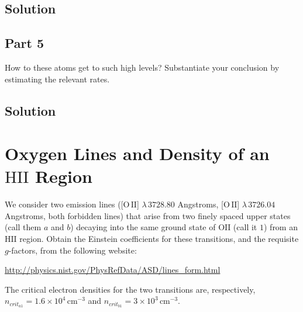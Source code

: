 \documentclass[12pt]{article}
\begin{document}
\subsection*{Solution}




\subsection*{Part 5}

How to these atoms get to such high levels? Substantiate your conclusion by estimating the relevant rates.


\subsection*{Solution}






\section{Oxygen Lines and Density of an $\mathrm{HII}$ Region}

We consider two emission lines ([$\mathrm{O\,II}$] $\lambda\,3728.80$ Angstroms, [$\mathrm{O\,II}$] $\lambda\,3726.04$ Angstroms, both forbidden lines) that arise from two finely spaced upper states (call them $a$ and $b$) decaying into the same ground state of $\mathrm{OII}$ (call it $1$) from an $\mathrm{HII}$ region. Obtain the Einstein coefficients for these transitions, and the requisite $g$-factors, from the following website:

\href{http://physics.nist.gov/PhysRefData/ASD/lines_form.html}{http://physics.nist.gov/PhysRefData/ASD/lines\_form.html}

The critical electron densities for the two transitions are, respectively, $n_{crit_{a1}}=1.6\times10^4\,\mathrm{cm^{-3}}$ and $n_{crit_{b1}}=3\times10^3\,\mathrm{cm^{-3}}$.
\end{document}
